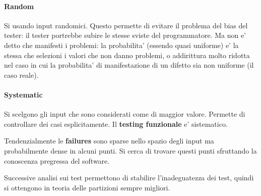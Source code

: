 \paragraph{Random}

Si usando input randomici. Questo permette di evitare il problema del bias del tester: il tester portrebbe subire le stesse sviste del programmatore. Ma non e' detto che manifesti i problemi: la probabilita' (essendo quasi uniforme) e' la stessa che selezioni i valori che non danno problemi, o addirittura molto ridotta nel caso in cui la probabilita' di manifestazione di un difetto sia non uniforme (il caso reale).

\paragraph{Systematic}

Si scelgono gli input che sono considerati come di maggior valore. Permette di controllare dei casi esplicitamente.
Il \textbf{testing funzionale} e' sistematico.

Tendenzialmente le \textbf{failures} sono sparse nello spazio degli input ma probabilmente dense in alcuni punti. Si cerca di trovare questi punti sfruttando la conoscenza pregressa del software.

Successive analisi sui test permettono di stabilire l'inadeguatezza dei test, quindi si ottengono in teoria delle partizioni sempre migliori.
